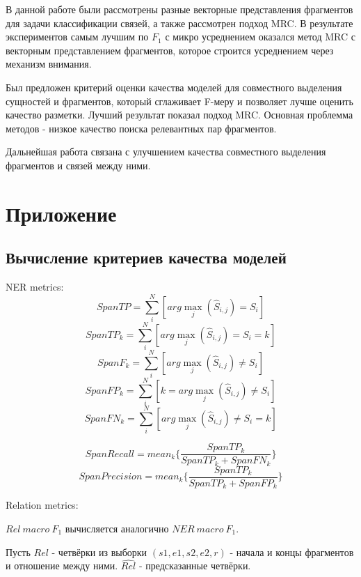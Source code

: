 \documentclass[12pt]{article}
\begin{document}
В данной работе были рассмотрены разные векторные представления фрагментов для задачи классификации связей, а также рассмотрен подход MRC. В результате экспериментов самым лучшим по $F_1$ с микро усреднением оказался метод MRC с векторным представлением фрагментов, которое строится усреднением через механизм внимания.

Был предложен критерий оценки качества моделей для совместного выделения сущностей и фрагментов, который сглаживает F-меру и позволяет лучше оценить качество разметки. Лучший результат показал подход MRC.
Основная проблемма методов - низкое качество поиска релевантных пар фрагментов.

Дальнейшая работа связана с улучшением качества совместного выделения фрагментов и связей между ними.
\clearpage



\clearpage
\section{Приложение}

\subsection{Вычисление критериев качества моделей}

NER metrics:
$$
SpanTP = \sum_i^N [arg\max_j(\hat{S}_{i, j}) = S_i]
$$
$$
SpanTP_k = \sum_i^N [arg\max_j(\hat{S}_{i, j}) = S_i = k]
$$
$$
SpanF_k = \sum_i^N [arg\max_j(\hat{S}_{i, j}) \neq S_i]
$$
$$
SpanFP_k = \sum_i^N [k = arg\max_j(\hat{S}_{i, j}) \neq S_i]
$$
$$
SpanFN_k = \sum_i^N [arg\max_j(\hat{S}_{i, j}) \neq S_i = k]
$$
\begin{center}
\end{center}
$$
SpanRecall = mean_k\{ \frac{SpanTP_k}{ SpanTP_k + SpanFN_k} \}
$$
$$
SpanPrecision = mean_k\{ \frac{SpanTP_k}{ SpanTP_k + SpanFP_k} \}
$$
\begin{center}
\end{center}

Relation metrics:

$Rel~macro~F_1$ вычисляется аналогично $NER~macro~F_1$.

Пусть $Rel$ - четвёрки из выборки $(s1, e1, s2, e2, r)$ - начала и концы фрагментов и отношение между ними. $\hat{Rel}$ - предсказанные четвёрки.
\end{document}
